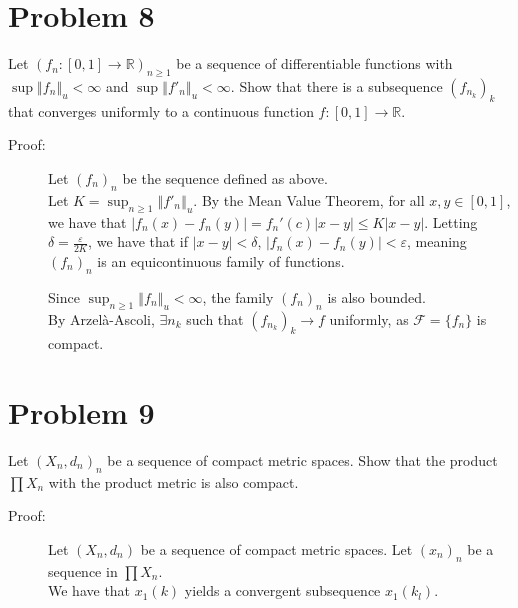 \documentclass[10pt]{extarticle}
\newcommand{\R}{\mathbb{R}}
\newcommand{\norm}[1]{\left\Vert #1\right\Vert}
\begin{document}
  \section{Problem 8}%
  Let $(f_n: [0,1]\rightarrow \R)_{n\geq 1}$ be a sequence of differentiable functions with $\sup\norm{f_n}_u < \infty$ and $\sup\norm{f'_n}_u < \infty$. Show that there is a subsequence $\left(f_{n_k}\right)_k$ that converges uniformly to a continuous function $f: [0,1]\rightarrow \R$.
  \begin{description}
    \item[Proof:] Let $(f_n)_n$ be the sequence defined as above.\\

      Let $K = \sup_{n\geq 1}\norm{f'_n}_u$. By the Mean Value Theorem, for all $x,y\in [0,1]$, we have that $|f_n(x)-f_n(y)| = f_n'(c)|x-y| \leq K|x-y|$. Letting $\delta = \frac{\varepsilon}{2K}$, we have that if $|x-y| < \delta$, $|f_n(x) - f_n(y)| < \varepsilon$, meaning $(f_n)_n$ is an equicontinuous family of functions.

      Since $\sup_{n\geq 1}\norm{f_n}_u < \infty$, the family $(f_n)_n$ is also bounded.\\

      By Arzelà-Ascoli, $\exists n_k$ such that $\left(f_{n_k}\right)_k \rightarrow f$ uniformly, as $\mathcal{F} = \{f_n\}$ is compact.
  \end{description}
  \section{Problem 9}%
  Let $(X_n,d_n)_n$ be a sequence of compact metric spaces. Show that the product $\prod X_n$ with the product metric is also compact.
  \begin{description}
    \item[Proof:] Let $(X_n,d_n)$ be a sequence of compact metric spaces. Let $(x_n)_n$ be a sequence in $\prod X_n$.\\

      We have that $x_1(k)$ yields a convergent subsequence $x_1\left(k_l\right)$.
  \end{description}
\end{document}
